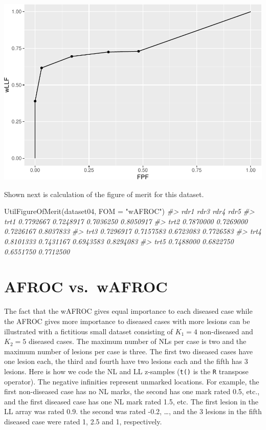 \documentclass[
]{book}
\newenvironment{Shaded}{\begin{snugshade}}{\end{snugshade}}
\newcommand{\AttributeTok}[1]{\textcolor[rgb]{0.77,0.63,0.00}{#1}}
\newcommand{\CommentTok}[1]{\textcolor[rgb]{0.56,0.35,0.01}{\textit{#1}}}
\newcommand{\FunctionTok}[1]{\textcolor[rgb]{0.00,0.00,0.00}{#1}}
\newcommand{\NormalTok}[1]{#1}
\newcommand{\StringTok}[1]{\textcolor[rgb]{0.31,0.60,0.02}{#1}}
\begin{document}
\includegraphics{03-empirical_files/figure-latex/unnamed-chunk-10-1.pdf}

Shown next is calculation of the figure of merit for this dataset.

\begin{Shaded}
\begin{Highlighting}[]
\FunctionTok{UtilFigureOfMerit}\NormalTok{(dataset04, }\AttributeTok{FOM =} \StringTok{"wAFROC"}\NormalTok{)}
\CommentTok{\#\textgreater{}           rdr1      rdr3      rdr4      rdr5}
\CommentTok{\#\textgreater{} trt1 0.7792667 0.7248917 0.7036250 0.8050917}
\CommentTok{\#\textgreater{} trt2 0.7870000 0.7269000 0.7226167 0.8037833}
\CommentTok{\#\textgreater{} trt3 0.7296917 0.7157583 0.6723083 0.7726583}
\CommentTok{\#\textgreater{} trt4 0.8101333 0.7431167 0.6943583 0.8294083}
\CommentTok{\#\textgreater{} trt5 0.7488000 0.6822750 0.6551750 0.7712500}
\end{Highlighting}
\end{Shaded}

\hypertarget{empirical-numerical-understanding}{%
\section{AFROC vs.~wAFROC}\label{empirical-numerical-understanding}}

The fact that the wAFROC gives equal importance to each diseased case while the AFROC gives more importance to diseased cases with more lesions can be illustrated with a fictitious small dataset consisting of \(K_1 = 4\) non-diseased and \(K_2 = 5\) diseased cases. The maximum number of NLs per case is two and the maximum number of lesions per case is three. The first two diseased cases have one lesion each, the third and fourth have two lesions each and the fifth has 3 lesions. Here is how we code the NL and LL z-samples (\texttt{t()} is the \texttt{R} transpose operator). The negative infinities represent unmarked locations. For example, the first non-diseased case has no NL marks, the second has one mark rated 0.5, etc., and the first diseased case has one NL mark rated 1.5, etc. The first lesion in the LL array was rated 0.9. the second was rated -0.2, \ldots, and the 3 lesions in the fifth diseased case were rated 1, 2.5 and 1, respectively.
\end{document}
